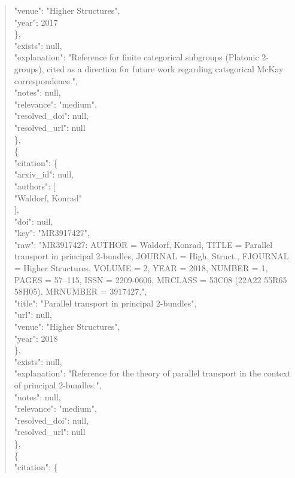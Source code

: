 \documentclass[11pt]{article}
\begin{document}
\begin{quote}
        "venue": "Higher Structures",\\
        "year": 2017\\
      \},\\
      "exists": null,\\
      "explanation": "Reference for finite categorical subgroups (Platonic 2-groups), cited as a direction for future work regarding categorical McKay correspondence.",\\
      "notes": null,\\
      "relevance": "medium",\\
      "resolved\_doi": null,\\
      "resolved\_url": null\\
    \},\\
    \{\\
      "citation": \{\\
        "arxiv\_id": null,\\
        "authors": [\\
          "Waldorf, Konrad"\\
        ],\\
        "doi": null,\\
        "key": "MR3917427",\\
        "raw": "MR3917427: AUTHOR = Waldorf, Konrad, TITLE = Parallel transport in principal 2-bundles, JOURNAL = High. Struct., FJOURNAL = Higher Structures, VOLUME = 2, YEAR = 2018, NUMBER = 1, PAGES = 57--115, ISSN = 2209-0606, MRCLASS = 53C08 (22A22 55R65 58H05), MRNUMBER = 3917427,",\\
        "title": "Parallel transport in principal 2-bundles",\\
        "url": null,\\
        "venue": "Higher Structures",\\
        "year": 2018\\
      \},\\
      "exists": null,\\
      "explanation": "Reference for the theory of parallel transport in the context of principal 2-bundles.",\\
      "notes": null,\\
      "relevance": "medium",\\
      "resolved\_doi": null,\\
      "resolved\_url": null\\
    \},\\
    \{\\
      "citation": \{\\

\end{quote}
\end{document}
